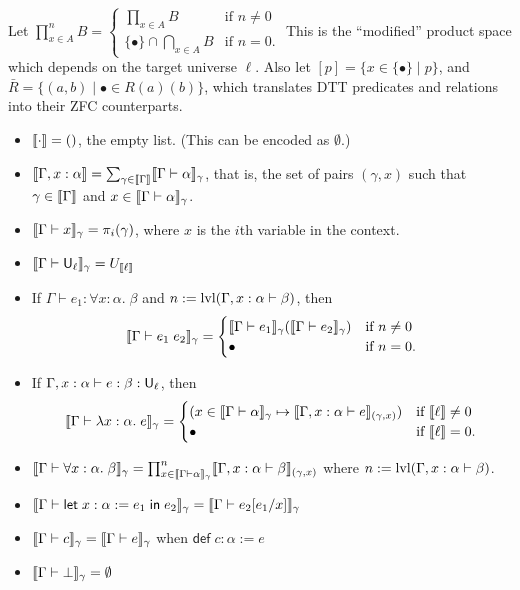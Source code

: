 Let $\prod^n_{x\in A}B=\begin{cases}
\prod_{x\in A}B&\mbox{if }n\ne 0\\
\{\bullet\}\cap\bigcap_{x\in A}B&\mbox{if }n=0.
\end{cases}$ This is the ``modified'' product space which depends on the target universe $\ell$. Also let $[p]=\{x\in\{\bullet\}\mid p\}$, and $\bar R=\{(a,b)\mid\bullet\in R(a)(b)\}$, which translates DTT predicates and relations into their ZFC counterparts.
\begin{itemize}
\item $\llbracket \cdot\rrbracket=()$, the empty list. (This can be encoded as $\emptyset$.)
\item $\scott{\Gamma,x:\alpha}=\sum_{\gamma\in\scott{\Gamma}}\scott{\Gamma\vdash\alpha}_\gamma$, that is, the set of pairs $(\gamma,x)$ such that $\gamma\in\scott{\Gamma}$ and $x\in\scott{\Gamma\vdash\alpha}_\gamma$.
\item $\scott{\Gamma\vdash x}_\gamma=\pi_i(\gamma)$, where $x$ is the $i$th variable in the context.
\item $\scott{\Gamma\vdash\U_\ell}_\gamma=U_{\scott{\ell}}$
\item If $\Gamma\vdash e_1:\forall x:\alpha.\;\beta$ and $n:=\lvl(\Gamma, x:\alpha\vdash \beta)$, then $$\scott{\Gamma\vdash e_1\;e_2}_\gamma=\begin{cases}
\scott{\Gamma\vdash e_1}_\gamma(\scott{\Gamma\vdash e_2}_\gamma)&\mbox{if }n\ne 0\\
\bullet&\mbox{if }n=0.
\end{cases}$$
\item If $\Gamma,x:\alpha\vdash e:\beta:\U_\ell$, then
$$\scott{\Gamma\vdash \lambda x:\alpha.\;e}_\gamma=\begin{cases}
(x\in\scott{\Gamma\vdash \alpha}_\gamma\mapsto\scott{\Gamma,x:\alpha\vdash e}_{(\gamma,x)})&\mbox{if }\scott{\ell}\ne 0\\
\bullet&\mbox{if }\scott{\ell}=0.
\end{cases}$$
\item $\scott{\Gamma\vdash \forall x:\alpha.\;\beta}_\gamma=\prod^n_{x\in \scott{\Gamma\vdash\alpha}_\gamma}\scott{\Gamma,x:\alpha\vdash\beta}_{(\gamma,x)}$ where $n:=\lvl(\Gamma,x:\alpha\vdash\beta)$.
\item $\scott{\Gamma\vdash\elet{x:\alpha:=e_1}{e_2}}_\gamma=\scott{\Gamma\vdash e_2[e_1/x]}_\gamma$
\item $\scott{\Gamma\vdash c}_\gamma=\scott{\Gamma\vdash e}_\gamma$ when $\mathsf{def}\;c:\alpha:=e$
\item $\scott{\Gamma\vdash\bot}_\gamma=\emptyset$

\end{itemize}
